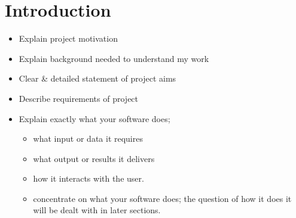 %
%
%
\chapter{Introduction}
\label{chap:introduction}


\begin{itemize}
\item Explain project motivation
\item Explain background needed to understand my work
\item Clear \& detailed statement of project aims
\item Describe requirements of project
\item Explain exactly what your software does; 
  \begin{itemize}
  \item what input or data it requires
  \item what output or results it delivers
  \item how it interacts with the user.
  \item concentrate on what your software does; the question of how it
    does it will be dealt with in later sections.
  \end{itemize}
\end{itemize}


